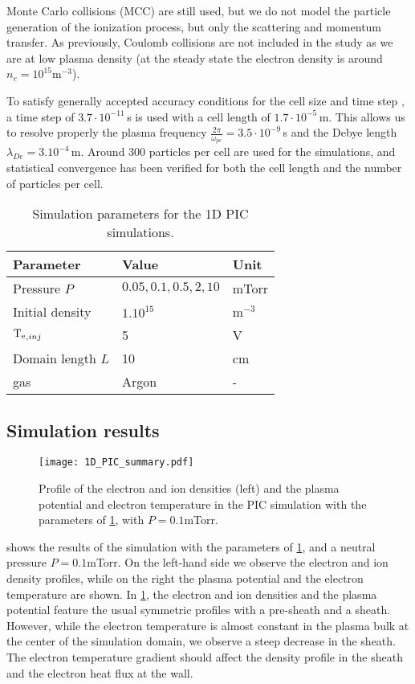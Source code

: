 Monte Carlo collisions (MCC) are still used, but we do not model the particle generation of the ionization process, but only the scattering and momentum transfer.
As previously, Coulomb collisions are not included in the study as we are at low plasma density (at the steady state the electron density is around $n_e = 10^{15}$m$^{-3}$).

To satisfy generally accepted accuracy conditions for the cell size and time step \citep{turner2013}, a time step of $3.7\cdot10^{-11}$\,s is used with a cell length of $1.7\cdot10^{-5}$\,m.
This allows us to resolve properly the plasma frequency $\frac{2 \pi}{\omega_{pe}} = 3.5\cdot10^{-9} $\,s and the Debye length $\lambda_{De} = 3.10^{-4}$\,m.
Around $300$ particles per cell are used for the simulations, and statistical convergence has been verified for both the cell length and the number of particles per cell.


\begin{table}
  \centering
  \begin{tabular}{lll}  \toprule
    Parameter & Value & Unit  \\ \midrule
    Pressure $P$ & $0.05,0.1,0.5, 2, 10$ & mTorr\\
    Initial density & $1 .10^{15}$ & m$^{-3}$\\
    $\mathrm{T_e}_{, inj}$& 5 & V\\
    Domain length $L$ & 10 & cm\\
    gas & Argon & -\\
    \bottomrule
  \end{tabular}
  \caption{Simulation parameters for the 1D PIC simulations.}
  \label{tab_1DPICParams}
\end{table}


\subsection{Simulation results} \label{subsec-1DPIC_results}

\begin{figure}[htbp]
  \centering
  \texttt{[image: 1D\_PIC\_summary.pdf]}
  \caption{Profile of the electron and ion densities (left) and the plasma potential and electron temperature in the PIC simulation with the parameters of \cref{tab_1DPICParams}, with $P=0.1$mTorr.}
  \label{fig-PIC1}
\end{figure}

 shows the results of the simulation with the parameters of \cref{tab_1DPICParams}, and a neutral pressure $P=0.1$mTorr.
On the left-hand side we observe the electron and ion density profiles, while on the right the plasma potential and the electron temperature are shown.
In \cref{fig-PIC1}, the electron and ion densities and the plasma potential feature the usual symmetric profiles with a pre-sheath and a sheath.
However, while the electron temperature is almost constant in the plasma bulk at the center of the simulation domain, we observe a steep decrease in the sheath.
The electron temperature gradient should affect the density profile in the sheath and the electron heat flux at the wall.

